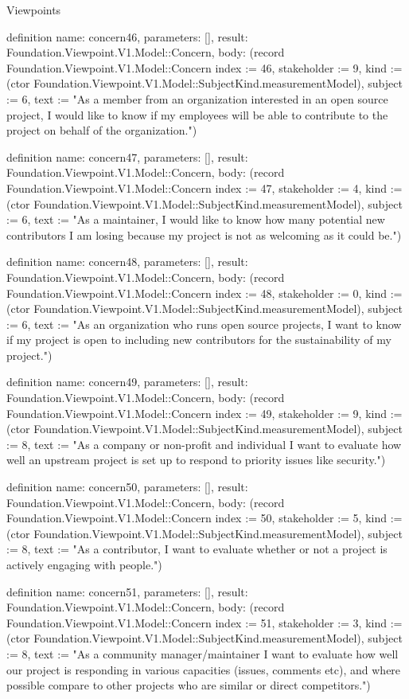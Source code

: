 \begin{lexlean}{Viewpoints}
\begin{semanticmodule}
definition{
  name: concern46,
  parameters: [],
  result: Foundation.Viewpoint.V1.Model::Concern,
  body: (record Foundation.Viewpoint.V1.Model::Concern {index := 46, stakeholder := 9, kind := (ctor Foundation.Viewpoint.V1.Model::SubjectKind.measurementModel), subject := 6, text := "As a member from an organization interested in an open source project, I would like to know if my employees will be able to contribute to the project on behalf of the organization."})
}

definition{
  name: concern47,
  parameters: [],
  result: Foundation.Viewpoint.V1.Model::Concern,
  body: (record Foundation.Viewpoint.V1.Model::Concern {index := 47, stakeholder := 4, kind := (ctor Foundation.Viewpoint.V1.Model::SubjectKind.measurementModel), subject := 6, text := "As a maintainer, I would like to know how many potential new contributors I am losing because my project is not as welcoming as it could be."})
}

definition{
  name: concern48,
  parameters: [],
  result: Foundation.Viewpoint.V1.Model::Concern,
  body: (record Foundation.Viewpoint.V1.Model::Concern {index := 48, stakeholder := 0, kind := (ctor Foundation.Viewpoint.V1.Model::SubjectKind.measurementModel), subject := 6, text := "As an organization who runs open source projects, I want to know if my project is open to including new contributors for the sustainability of my project."})
}

definition{
  name: concern49,
  parameters: [],
  result: Foundation.Viewpoint.V1.Model::Concern,
  body: (record Foundation.Viewpoint.V1.Model::Concern {index := 49, stakeholder := 9, kind := (ctor Foundation.Viewpoint.V1.Model::SubjectKind.measurementModel), subject := 8, text := "As a company or non-profit and individual I want to evaluate how well an upstream project is set up to respond to priority issues like security."})
}

definition{
  name: concern50,
  parameters: [],
  result: Foundation.Viewpoint.V1.Model::Concern,
  body: (record Foundation.Viewpoint.V1.Model::Concern {index := 50, stakeholder := 5, kind := (ctor Foundation.Viewpoint.V1.Model::SubjectKind.measurementModel), subject := 8, text := "As a contributor, I want to evaluate whether or not a project is actively engaging with people."})
}

definition{
  name: concern51,
  parameters: [],
  result: Foundation.Viewpoint.V1.Model::Concern,
  body: (record Foundation.Viewpoint.V1.Model::Concern {index := 51, stakeholder := 3, kind := (ctor Foundation.Viewpoint.V1.Model::SubjectKind.measurementModel), subject := 8, text := "As a community manager/maintainer I want to evaluate how well our project is responding in various capacities (issues, comments etc), and where possible compare to other projects who are similar or direct competitors."})
}


\end{semanticmodule}
\end{lexlean}
